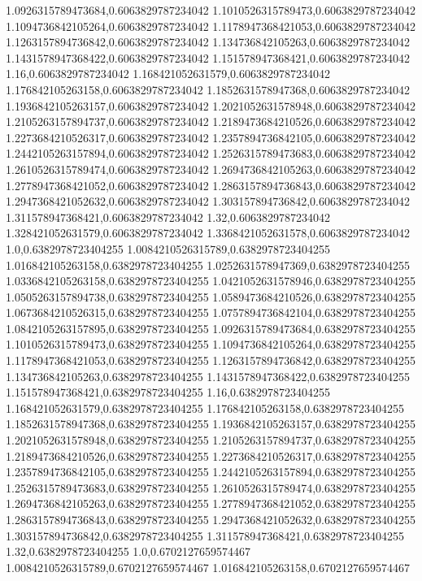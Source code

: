 1.0926315789473684,0.6063829787234042
1.1010526315789473,0.6063829787234042
1.1094736842105264,0.6063829787234042
1.1178947368421053,0.6063829787234042
1.1263157894736842,0.6063829787234042
1.134736842105263,0.6063829787234042
1.1431578947368422,0.6063829787234042
1.151578947368421,0.6063829787234042
1.16,0.6063829787234042
1.168421052631579,0.6063829787234042
1.176842105263158,0.6063829787234042
1.1852631578947368,0.6063829787234042
1.1936842105263157,0.6063829787234042
1.2021052631578948,0.6063829787234042
1.2105263157894737,0.6063829787234042
1.2189473684210526,0.6063829787234042
1.2273684210526317,0.6063829787234042
1.2357894736842105,0.6063829787234042
1.2442105263157894,0.6063829787234042
1.2526315789473683,0.6063829787234042
1.2610526315789474,0.6063829787234042
1.2694736842105263,0.6063829787234042
1.2778947368421052,0.6063829787234042
1.2863157894736843,0.6063829787234042
1.2947368421052632,0.6063829787234042
1.303157894736842,0.6063829787234042
1.311578947368421,0.6063829787234042
1.32,0.6063829787234042
1.328421052631579,0.6063829787234042
1.3368421052631578,0.6063829787234042
1.0,0.6382978723404255
1.0084210526315789,0.6382978723404255
1.016842105263158,0.6382978723404255
1.0252631578947369,0.6382978723404255
1.0336842105263158,0.6382978723404255
1.0421052631578946,0.6382978723404255
1.0505263157894738,0.6382978723404255
1.0589473684210526,0.6382978723404255
1.0673684210526315,0.6382978723404255
1.0757894736842104,0.6382978723404255
1.0842105263157895,0.6382978723404255
1.0926315789473684,0.6382978723404255
1.1010526315789473,0.6382978723404255
1.1094736842105264,0.6382978723404255
1.1178947368421053,0.6382978723404255
1.1263157894736842,0.6382978723404255
1.134736842105263,0.6382978723404255
1.1431578947368422,0.6382978723404255
1.151578947368421,0.6382978723404255
1.16,0.6382978723404255
1.168421052631579,0.6382978723404255
1.176842105263158,0.6382978723404255
1.1852631578947368,0.6382978723404255
1.1936842105263157,0.6382978723404255
1.2021052631578948,0.6382978723404255
1.2105263157894737,0.6382978723404255
1.2189473684210526,0.6382978723404255
1.2273684210526317,0.6382978723404255
1.2357894736842105,0.6382978723404255
1.2442105263157894,0.6382978723404255
1.2526315789473683,0.6382978723404255
1.2610526315789474,0.6382978723404255
1.2694736842105263,0.6382978723404255
1.2778947368421052,0.6382978723404255
1.2863157894736843,0.6382978723404255
1.2947368421052632,0.6382978723404255
1.303157894736842,0.6382978723404255
1.311578947368421,0.6382978723404255
1.32,0.6382978723404255
1.0,0.6702127659574467
1.0084210526315789,0.6702127659574467
1.016842105263158,0.6702127659574467
